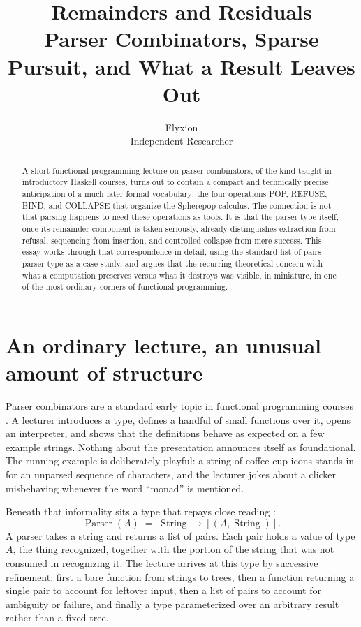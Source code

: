 \documentclass[11pt]{article}
\title{\textbf{Remainders and Residuals}\\[4pt]
\large Parser Combinators, Sparse Pursuit, and What a Result Leaves Out}
\author{Flyxion\\ \small Independent Researcher}
\date{}
\begin{document}
\maketitle

\begin{abstract}
\noindent A short functional-programming lecture on parser combinators, of the kind taught in introductory Haskell courses, turns out to contain a compact and technically precise anticipation of a much later formal vocabulary: the four operations POP, REFUSE, BIND, and COLLAPSE that organize the Spherepop calculus. The connection is not that parsing happens to need these operations as tools. It is that the parser type itself, once its remainder component is taken seriously, already distinguishes extraction from refusal, sequencing from insertion, and controlled collapse from mere success. This essay works through that correspondence in detail, using the standard list-of-pairs parser type as a case study, and argues that the recurring theoretical concern with what a computation preserves versus what it destroys was visible, in miniature, in one of the most ordinary corners of functional programming.
\end{abstract}

\section{An ordinary lecture, an unusual amount of structure}

Parser combinators are a standard early topic in functional programming courses \cite{meijer-functional-parsers}. A lecturer introduces a type, defines a handful of small functions over it, opens an interpreter, and shows that the definitions behave as expected on a few example strings. Nothing about the presentation announces itself as foundational. The running example is deliberately playful: a string of coffee-cup icons stands in for an unparsed sequence of characters, and the lecturer jokes about a clicker misbehaving whenever the word ``monad'' is mentioned.

Beneath that informality sits a type that repays close reading \cite{hutton-meijer-1998}:
\[
\operatorname{Parser}(A) \;=\; \operatorname{String} \longrightarrow [(A, \operatorname{String})].
\]
A parser takes a string and returns a list of pairs. Each pair holds a value of type $A$, the thing recognized, together with the portion of the string that was not consumed in recognizing it. The lecture arrives at this type by successive refinement: first a bare function from strings to trees, then a function returning a single pair to account for leftover input, then a list of pairs to account for ambiguity or failure, and finally a type parameterized over an arbitrary result rather than a fixed tree.
\end{document}
